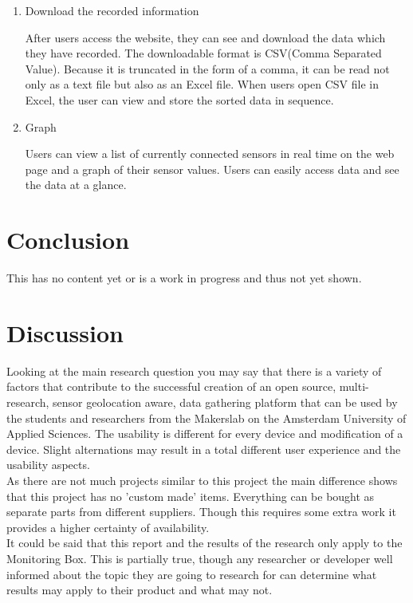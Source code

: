 \documentclass[conference]{IEEEtran}
\begin{document}
\begin{enumerate}
\begin{enumerate}
\begin{enumerate}
\item Download the recorded information

 After users access the website, they can see and download the data which they have recorded. The downloadable format is CSV(Comma Separated Value). Because it is truncated in the form of a comma, it can be read not only as a text file but also as an Excel file. When users open CSV file in Excel, the user can view and store the sorted data in sequence.\\

\item Graph

 Users can view a list of currently connected sensors in real time on the web page and a graph of their sensor values. Users can easily access data and see the data at a glance.\\

\end{enumerate}
\end{enumerate}
 
\end{enumerate}

\section{Conclusion}
This has no content yet or is a work in progress and thus not yet shown.

\section{Discussion}
Looking at the main research question you may say that there is a variety of factors that contribute to the successful creation of an open source, multi-research, sensor geolocation aware, data gathering platform that can be used by the students and researchers from the Makerslab on the Amsterdam University of Applied Sciences. The usability is different for every device and modification of a device. Slight alternations may result in a total different user experience and the usability aspects. \\
As there are not much projects similar to this project the main difference shows that this project has no 'custom made' items. Everything can be bought as separate parts from different suppliers. Though this requires some extra work it provides a higher certainty of availability. \\
It could be said that this report and the results of the research only apply to the Monitoring Box. This is partially true, though any researcher or developer well informed about the topic they are going to research for can determine what results may apply to their product and what may not.
\end{document}
